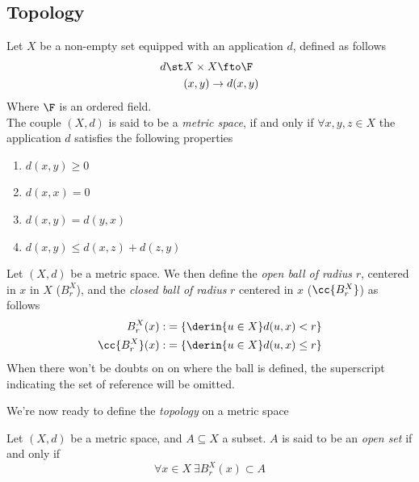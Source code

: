 \documentclass[../mmf.tex]{subfiles}
\begin{document}
\subsection{Topology}
\begin{dfn}
	Let $X$ be a non-empty set equipped with an application $d$, defined as follows
	\begin{equation}
		\begin{aligned}
			d\st&X\times X\fto\F\\
			&(x,y)\to d(x,y)
		\end{aligned}
		\label{eq:distdef}
	\end{equation}
	Where $\F$ is an ordered field.\\
	The couple $(X,d)$ is said to be a \textit{metric space}, if and only if $\forall x,y,z\in X$ the application $d$ satisfies the following properties
	\begin{enumerate}
	\item $d(x,y)\ge0$
	\item $d(x,x)=0$
	\item $d(x,y)=d(y,x)$
	\item $d(x,y)\le  d(x,z)+d(z,y)$
	\end{enumerate}
\end{dfn}
\begin{dfn}[Ball]
	Let $(X,d)$ be a metric space. We then define the \textit{open ball of radius} $r$, centered in $x$ in $X$ ($B_r^X$), and the \textit{closed ball of radius} $r$ centered in $x$ ($\cc{B_r^X}$) as follows
	\begin{equation}
		\begin{aligned}
			B_r^X(x):&=\{\derin{u\in X}d(u,x)<r\}\\
			\cc{B_r^X}(x):&=\{\derin{u\in X}d(u,x)\le r\}
		\end{aligned}
		\label{eq:openclosedball}
	\end{equation}
	When there won't be doubts on on where the ball is defined, the superscript indicating the set of reference will be omitted.
\end{dfn}
We're now ready to define the \textit{topology} on a metric space
\begin{dfn}
	Let $(X,d)$ be a metric space, and $A\subseteq X$ a subset. $A$ is said to be an \textit{open set} if and only if
	\begin{equation}
		\forall x\in X\ \exists B_r^X(x)\subset A
		\label{eq:opensetdef}
	\end{equation}
\end{dfn}
\end{document}

